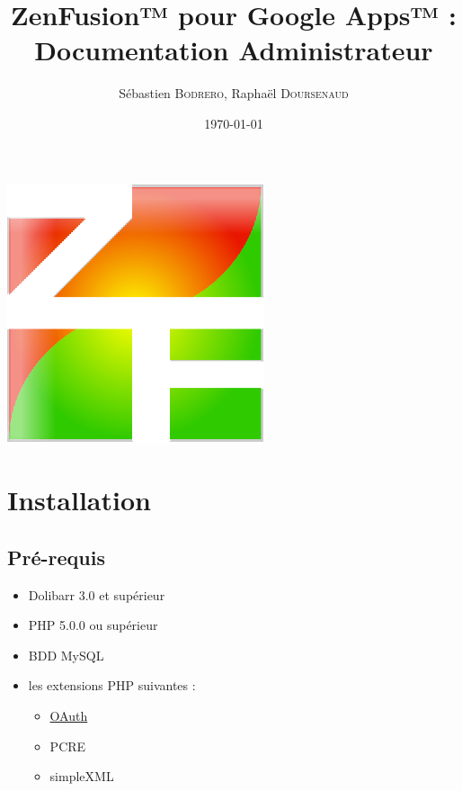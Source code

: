 \documentclass[12pt,a4paper,titlepage]{article}
\author{Sébastien \textsc{Bodrero}, Raphaël \textsc{Doursenaud}}
\title{ZenFusion™ pour Google Apps™ : Documentation Administrateur}
\date{\today}
\begin{document}
	
\begin{titlepage}

	\begin{center}

	\includegraphics{ZenFusion}
	
	\end{center}
	

\end{titlepage}
		
	
	\section{Installation}
	
		\subsection{Pré-requis}
		
		\begin{itemize}
			\item Dolibarr 3.0 et supérieur
			\item PHP 5.0.0 ou supérieur
			\item BDD MySQL
			\item les extensions PHP suivantes :
			\begin{itemize}
				\item \href{http://pecl.php.net/package/oauth}{OAuth}
				\item PCRE
				\item simpleXML
			\end{itemize} 
		\end{itemize}
		
\end{document}
